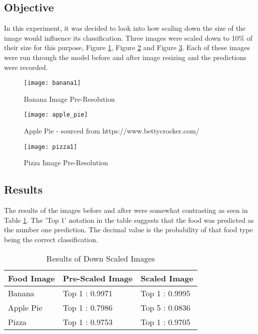 \tocless\subsection{Objective}
In this experiment, it was decided to look into how scaling down the size of the image would influence its classification. Three images were scaled down to 10\% of their size for this purpose, Figure \ref{fig:bananaPreRes}, Figure \ref{fig:apple_piePreRes} and Figure \ref{fig:pizzaPreRes}. Each of these images were run through the model before and after image resizing and the predictions were recorded.

\begin{figure}[h]
	\centering
    \texttt{[image: banana1]}
    \caption{Banana Image Pre-Resolution}
    \label{fig:bananaPreRes}
\end{figure}

\begin{figure}[h]
	\centering
    \texttt{[image: apple\_pie]}
    \caption{Apple Pie - sourced from https://www.bettycrocker.com/}
    \label{fig:apple_piePreRes}
\end{figure}

\begin{figure}[h]
	\centering
    \texttt{[image: pizza1]}
    \caption{Pizza Image Pre-Resolution}
    \label{fig:pizzaPreRes}
\end{figure}

\tocless\subsection{Results}
The results of the images before and after were somewhat contrasting as seen in Table \ref{scaledImages}.
The 'Top 1' notation in the table suggests that the food was predicted as the number one prediction. The decimal value is the probability of that food type being the correct classification.

\begin{table}[]
\centering
\caption{Results of Down Scaled Images}
\label{scaledImages}
\begin{tabular}{|l|l|l|}
\hline
\textbf{Food Image}& \textbf{Pre-Scaled Image} & \textbf{Scaled Image}   \\ \hline
Banana     & Top 1 : 0.9971   & Top 1 : 0.9995 \\ \hline
Apple Pie  & Top 1 : 0.7986   & Top 5 : 0.0836 \\ \hline
Pizza      & Top 1 : 0.9753   & Top 1 : 0.9705 \\ \hline
\end{tabular}
\end{table}

